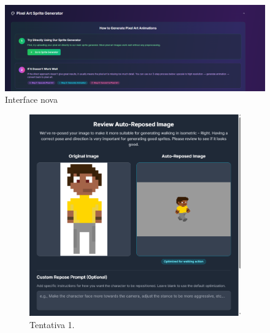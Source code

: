 \begin{figure}[htbp]
    \centering
    \caption{\small Interface nova}
    \label{fig:godmodModificado}
    \includegraphics[width=1\linewidth]{figs/godmodAI/site modificado.PNG}
\end{figure}

\begin{figure}[htbp]
    \centering
    \caption{\small Auto reposicionamento no God Mode AI}
    \label{fig:godmodAIrepose}
    \begin{subfigure}{0.35\linewidth}
        \includegraphics[width=1\linewidth]{figs/godmodAI/tela auto repose.PNG}
        \caption{\small Tentativa 1.}
        \label{fig:godmodAIrepose1}
    \end{subfigure}
    \begin{subfigure}{0.35\linewidth}

\end{subfigure}
\end{figure}
